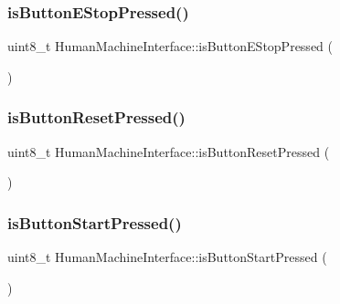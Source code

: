 \subsubsection{\texorpdfstring{is\+Button\+E\+Stop\+Pressed()}{isButtonEStopPressed()}}
{\footnotesize\ttfamily uint8\+\_\+t Human\+Machine\+Interface\+::is\+Button\+E\+Stop\+Pressed (\begin{DoxyParamCaption}{ }\end{DoxyParamCaption})}

\hypertarget{class_human_machine_interface_ab78f8bd8db3e0b150699416d8081ee98}{}\label{class_human_machine_interface_ab78f8bd8db3e0b150699416d8081ee98} 
\subsubsection{\texorpdfstring{is\+Button\+Reset\+Pressed()}{isButtonResetPressed()}}
{\footnotesize\ttfamily uint8\+\_\+t Human\+Machine\+Interface\+::is\+Button\+Reset\+Pressed (\begin{DoxyParamCaption}{ }\end{DoxyParamCaption})}

\hypertarget{class_human_machine_interface_a4926796f1c1411f975e2da96c68079dd}{}\label{class_human_machine_interface_a4926796f1c1411f975e2da96c68079dd} 
\subsubsection{\texorpdfstring{is\+Button\+Start\+Pressed()}{isButtonStartPressed()}}
{\footnotesize\ttfamily uint8\+\_\+t Human\+Machine\+Interface\+::is\+Button\+Start\+Pressed (\begin{DoxyParamCaption}{ }\end{DoxyParamCaption})}

\hypertarget{class_human_machine_interface_a6b150a5a2978b620a3823aaeda7e80b8}{}\label{class_human_machine_interface_a6b150a5a2978b620a3823aaeda7e80b8} 
